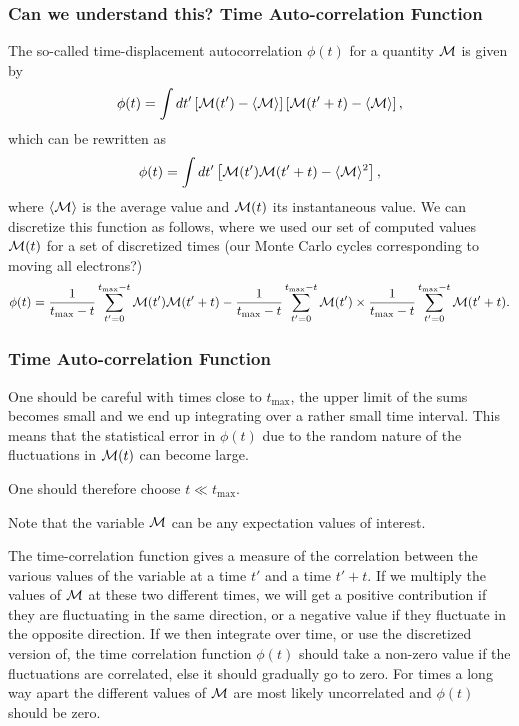 \documentclass{beamer}
\begin{document}
\begin{frame}
\frametitle{Can we understand this? Time Auto-correlation Function}

\begin{block}{}
The so-called time-displacement autocorrelation $\phi(t)$ for a quantity ${\cal M}$ is given by
\[
\phi(t) = \int dt' \left[{\cal M}(t')-\langle {\cal M} \rangle\right]\left[{\cal M}(t'+t)-\langle {\cal M} \rangle\right],
\]
which can be rewritten as 
\[
\phi(t) = \int dt' \left[{\cal M}(t'){\cal M}(t'+t)-\langle {\cal M} \rangle^2\right],
\]
where $\langle {\cal M} \rangle$ is the average value and
${\cal M}(t)$ its instantaneous value. We can discretize this function as follows, where we used our
set of computed values ${\cal M}(t)$ for a set of discretized times (our Monte Carlo cycles corresponding to moving all electrons?)
\[
\phi(t)  = \frac{1}{t_{\mathrm{max}}-t}\sum_{t'=0}^{t_{\mathrm{max}}-t}{\cal M}(t'){\cal M}(t'+t)
-\frac{1}{t_{\mathrm{max}}-t}\sum_{t'=0}^{t_{\mathrm{max}}-t}{\cal M}(t')\times
\frac{1}{t_{\mathrm{max}}-t}\sum_{t'=0}^{t_{\mathrm{max}}-t}{\cal M}(t'+t).
\label{eq:phitf}
\]
\end{block}
\end{frame}

\begin{frame}
\frametitle{Time Auto-correlation Function}

\begin{block}{}
One should be careful with times close to $t_{\mathrm{max}}$, the upper limit of the sums 
becomes small and we end up integrating over a rather small time interval. This means that the statistical
error in $\phi(t)$ due to the random nature of the fluctuations in ${\cal M}(t)$ can become large.

One should therefore choose $t \ll t_{\mathrm{max}}$.

Note that the variable ${\cal M}$ can be any expectation values of interest.



The time-correlation function gives a measure of the correlation between the various values of the variable 
at a time $t'$ and a time $t'+t$. If we multiply the values of ${\cal M}$ at these two different times,
we will get a positive contribution if they are fluctuating in the same direction, or a negative value
if they fluctuate in the opposite direction. If we then integrate over time, or use the discretized version of, the time correlation function $\phi(t)$ should take a non-zero value if the fluctuations are 
correlated, else it should gradually go to zero. For times a long way apart 
the different values of ${\cal M}$  are most likely 
uncorrelated and $\phi(t)$ should be zero.
\end{block}
\end{frame}
\end{document}

